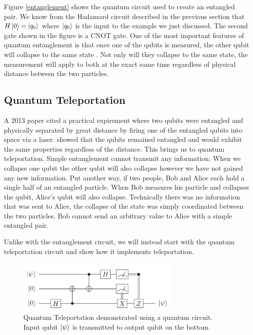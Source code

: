 \documentclass[conference]{IEEEtran}
\begin{document}
Figure \ref{entanglement} shows the quantum circuit used to create an entangled pair. We know from the Hadamard circuit described in the previous section that $H\ket{0} = \ket{q_0}$ where $\ket{q_0}$ is the input to the example we just discussed. The second gate shown in the figure is a CNOT gate. One of the most important features of quantum entanglement is that once one of the qubits is measured, the other qubit will collapse to the same state \cite{b8}. Not only will they collapse to the same state, the measurement will apply to both at the exact same time regardless of physical distance between the two particles.

\subsection{Quantum Teleportation}

A 2013 paper \cite{b7} cited a practical expirement where two qubits were entangled and physically separated by great distance by firing one of the entangled qubits into space via a laser. \cite{b7} showed that the qubits remained entangled and would exhibit the same properties regardless of the distance. This brings us to quantum teleportation. Simple entanglement cannot transmit any information. When we collapse one qubit the other qubit will also collapse however we have not gained any new information. Put another way, if two people, Bob and Alice each hold a single half of an entangled particle. When Bob measures his particle and collapses the qubit, Alice's qubit will also collapse. Technically there was no information that was sent to Alice, the collapse of the state was simply coordinated between the two particles. Bob cannot send an arbitrary value to Alice with a simple entangled pair.

Unlike with the entanglement circuit, we will instead start with the quantum teleportation circuit and show how it implements teleportation.

\begin{figure}[htbp]
\centerline{\includegraphics[width=8cm]{teleportation_circuit.png}}
\caption{Quantum Teleportation demonstrated using a quantum circuit. Input qubit $\ket{\psi}$ is transmitted to output qubit on the bottom.}
\label{teleportion}
\end{figure}
\end{document}
